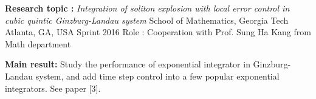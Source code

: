 \begin{cventries}
\cventrymore
{\textbf{Research topic :} \emph{Integration of soliton explosion with local error control in cubic quintic 
  Ginzburg-Landau system}}
{School of Mathematics, Georgia Tech} 
{Atlanta, GA, USA} %
{Sprint 2016} %
{Role : Cooperation with Prof. Sung Ha Kang from Math department}
{
  \begin{cvitems}
  \item {\textbf{Main result:}  Study the performance of exponential integrator in Ginzburg-Landau system,
      and add time step control into a few popular exponential integrators. See paper [3].}
  \end{cvitems}
}





\end{cventries}
